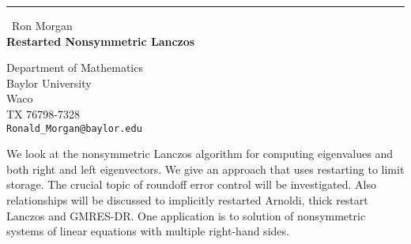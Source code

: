 \documentclass{report}
\begin{document}
\begin{center}
\rule{6in}{1pt} \
{\large Ron Morgan \\
{\bf Restarted Nonsymmetric Lanczos}}

Department of Mathematics \\ Baylor University \\ Waco \\ TX 76798-7328
\\
{\tt Ronald_Morgan@baylor.edu}\end{center}

We look at the nonsymmetric Lanczos algorithm for computing eigenvalues
and both right and left eigenvectors. We give an approach that uses
restarting to limit storage. The crucial topic of roundoff error control
will be investigated. Also relationships will be discussed to implicitly
restarted Arnoldi, thick restart Lanczos and GMRES-DR. One application is
to solution of nonsymmetric systems of linear equations with multiple
right-hand sides.
\end{document}
